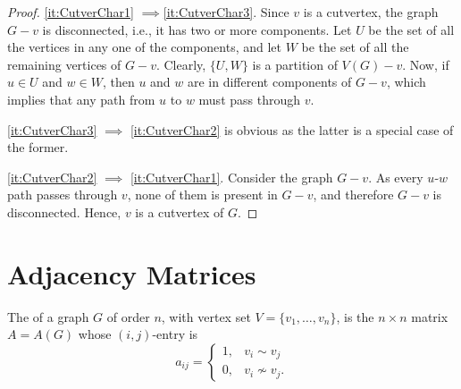 \begin{proof}
\cref{it:CutverChar1} $\implies $\cref{it:CutverChar3}. Since $v$ is a cutvertex, the graph $G - v$ is disconnected, i.e., it has two or more components. Let $U$ be the set of all the vertices in any one of the components, and let $W$ be the set of all the remaining vertices of $G - v$. Clearly, $\{U, W\}$ is a partition of $V(G) - v$. Now, if $u \in U$ and $w \in W$, then $u$ and $w$ are in different components of $G - v$, which implies that any path from $u$ to $w$ must pass through $v$.

\noindent \cref{it:CutverChar3} $\implies$ \cref{it:CutverChar2} is obvious as the latter is a special case of the former.

\noindent \cref{it:CutverChar2} $\implies$ \cref{it:CutverChar1}. Consider the graph $G - v$. As every $u$-$w$ path passes through $v$, none of them is present in $G - v$, and therefore $G - v$ is disconnected. Hence, $v$ is a cutvertex of $G$.
\end{proof}

\section{Adjacency Matrices}\label{sec:AdjMat}

The  of a graph $G$ of order $n$, with vertex set $V = \{v_1, \ldots, v_n\}$, is the $n \times n$ matrix $A = A(G)$ whose $(i,j)$-entry is
\begin{equation*}
a_{ij} = \begin{cases}
1, & v_i \sim v_j \\
0, & v_i \nsim v_j.
\end{cases}
\end{equation*}

